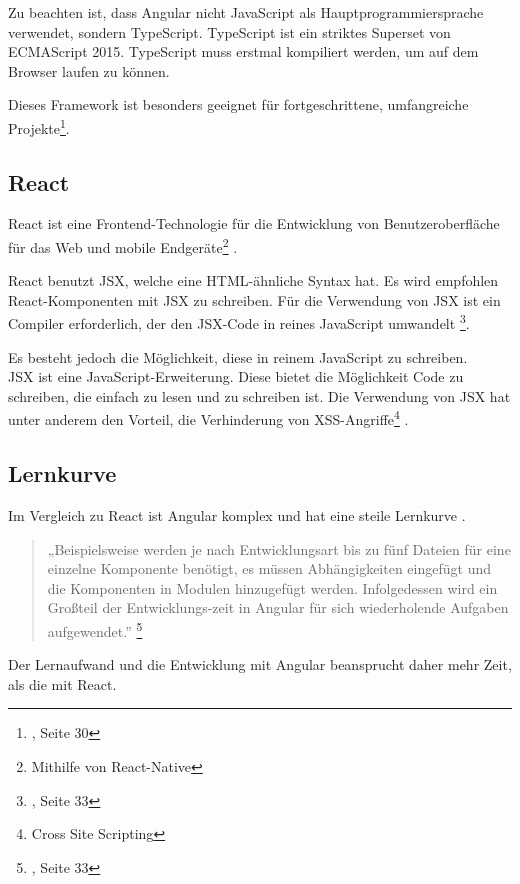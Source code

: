 
Zu beachten ist, dass Angular nicht JavaScript als Hauptprogrammiersprache verwendet, sondern TypeScript.
TypeScript ist ein striktes Superset von ECMAScript 2015.
TypeScript muss erstmal kompiliert werden, um auf dem Browser laufen zu können{\cite{MS1}}.

Dieses Framework ist besonders geeignet für fortgeschrittene, umfangreiche Projekte\footnote{{\cite{AN1}}, Seite 30}.

\subsection{React}
React ist eine Frontend-Technologie für die Entwicklung von Benutzeroberfläche für das Web und mobile Endgeräte\footnote{Mithilfe von React-Native} \cite{GH08}.

React benutzt JSX, welche eine HTML-ähnliche Syntax hat.
Es wird empfohlen React-Komponenten mit JSX zu schreiben.
Für die Verwendung von JSX ist ein Compiler erforderlich, der den JSX-Code in reines JavaScript umwandelt \footnote{{\cite{E01}, Seite 33}}.

Es besteht jedoch die Möglichkeit, diese in reinem JavaScript zu schreiben\cite{JSX1}.
\\
JSX ist eine JavaScript-Erweiterung.
Diese bietet die Möglichkeit Code zu schreiben, die einfach zu lesen und zu schreiben ist.
Die Verwendung von JSX hat unter anderem den Vorteil, die Verhinderung von XSS-Angriffe\footnote{Cross Site Scripting{\cite{OWASP}}} \cite{JSX1}.


\subsection{Lernkurve}
Im Vergleich zu React ist Angular komplex und hat eine steile Lernkurve {\cite{E01}}.
\begin{quote}
  „Beispielsweise werden je nach Entwicklungsart bis zu fünf Dateien für eine einzelne Komponente benötigt, es müssen Abhängigkeiten eingefügt und die Komponenten in Modulen hinzugefügt werden. Infolgedessen wird ein Großteil der Entwicklungs-zeit in Angular für sich wiederholende Aufgaben aufgewendet.”
  \footnote{{\cite{AN1}, Seite 33}}
\end{quote}
Der Lernaufwand und die Entwicklung mit Angular beansprucht daher mehr Zeit, als die mit React.

